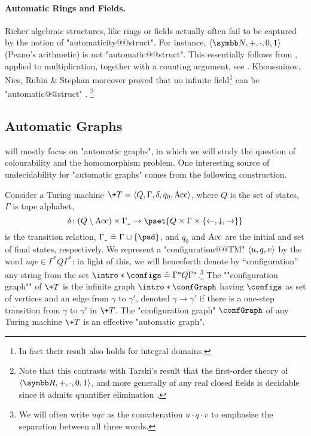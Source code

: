 \paragraph*{Automatic Rings and Fields.}
Richer algebraic structures, like rings or fields actually often fail to be captured by
the notion of "automaticity@@struct". For instance, $\tup{\N,{+},{\cdot},0,1}$ (Peano's arithmetic)
is not "automatic@@struct".
This essentially follows from , applied to multiplication,
together with a counting argument, see \cite[Corollary~XII.8.11]{Blumensath2024MSOModelTheory}.
Khoussainov, Nies, Rubin \& Stephan moreover proved that no infinite field\footnote{In fact their result also holds for integral domains.} can be "automatic@@struct"
\cite[Theorem~3.10 \& Corollary~3.11]{JainKhoussainovSchlichtStephan2019IsomorphismTreeAutomaticOrdinals}.%
\footnote{Note that this contrasts with Tarski's result that the first-order theory
of $\tup{\R,+,\cdot,0,1}$, and more generally of any real closed fields is 
decidable since it admits quantifier elimination \cite[Theorem~8.4.4]{Hodges1993ModelTheory}.}


\subsection{Automatic Graphs}
 will mostly focus on "automatic graphs", in which we will study
the question of colourability and the homomorphism problem.
One interesting source of undecidability for "automatic graphs" comes from the following construction.

\begin{example}
	\AP\label{ex:turing-machine-are-automatic}
	Consider a Turing machine $\+T = \tup{Q,\Gamma,\delta,q_0,\Acc}$, where $Q$ is the set of states, $\Gamma$ is tape alphabet,
	\[
		\delta\colon (Q \setminus \Acc) \times \Gamma_{\smallpad} \to \pset{Q \times \Gamma \times \set{\leftarrow, \downarrow, \rightarrow}}
	\]
	is the transition relation, $\Gamma_{\smallpad} \defeq \Gamma \dcup \set{\pad}$, and $q_0$ and $\textrm{Acc}$ are the initial and set of final states, respectively.
	We represent a "configuration@@TM" $\langle u, q, v\rangle$ by the word $uqv \in \Gamma^* Q \Gamma^*$:
	in light of this, we will henceforth denote by ``configuration'' any string from the set  \AP$\intro*\configs \defeq  \Gamma^* Q \Gamma^*$.\footnote{We will often write
	$uqv$ as the concatenation $u\cdot q \cdot v$ to emphasize
	the separation between all three words.}
	The \AP""configuration graph"" of $\+T$ is the infinite graph $\intro*\confGraph$ having $\configs$ as set of vertices and an edge from $\gamma$ to $\gamma'$, denoted $\gamma \rightarrow \gamma'$ if there is a one-step transition from $\gamma$ to $\gamma'$ in $\+T$. The "configuration graph" $\confGraph$ of any Turing machine $\+T$ is an effective "automatic graph".
\end{example}

